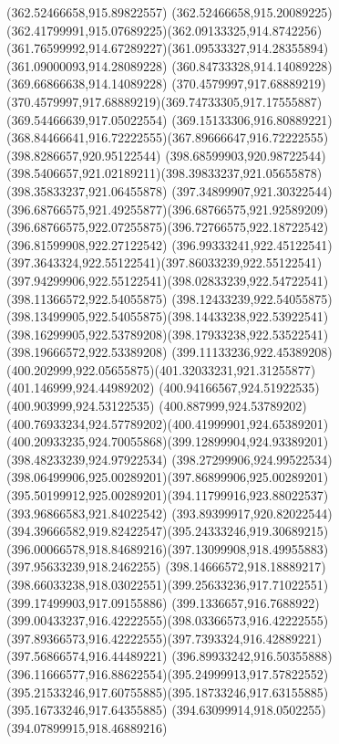 {{{{				\lineto(362.52466658,915.89822557)
				\curveto(362.52466658,915.20089225)(362.41799991,915.07689225)(362.09133325,914.8742256)
				\curveto(361.76599992,914.67289227)(361.09533327,914.28355894)(361.09000093,914.28089228)
				\lineto(360.84733328,914.14089228)
				\lineto(369.66866638,914.14089228)
				\lineto(370.4579997,917.68889219)
				\curveto(370.4579997,917.68889219)(369.74733305,917.17555887)(369.54466639,917.05022554)
				\curveto(369.15133306,916.80889221)(368.84466641,916.72222555)(367.89666647,916.72222555)
				\moveto(398.8286657,920.95122544)
				\curveto(398.68599903,920.98722544)(398.5406657,921.02189211)(398.39833237,921.05655878)
				\lineto(398.35833237,921.06455878)
				\curveto(397.34899907,921.30322544)(396.68766575,921.49255877)(396.68766575,921.92589209)
				\curveto(396.68766575,922.07255875)(396.72766575,922.18722542)(396.81599908,922.27122542)
				\curveto(396.99333241,922.45122541)(397.3643324,922.55122541)(397.86033239,922.55122541)
				\curveto(397.94299906,922.55122541)(398.02833239,922.54722541)(398.11366572,922.54055875)
				\curveto(398.12433239,922.54055875)(398.13499905,922.54055875)(398.14433238,922.53922541)
				\curveto(398.16299905,922.53789208)(398.17933238,922.53522541)(398.19666572,922.53389208)
				\curveto(399.11133236,922.45389208)(400.202999,922.05655875)(401.32033231,921.31255877)
				\lineto(401.146999,924.44989202)
				\lineto(400.94166567,924.51922535)
				\lineto(400.903999,924.53122535)
				\curveto(400.887999,924.53789202)(400.76933234,924.57789202)(400.41999901,924.65389201)
				\curveto(400.20933235,924.70055868)(399.12899904,924.93389201)(398.48233239,924.97922534)
				\curveto(398.27299906,924.99522534)(398.06499906,925.00289201)(397.86899906,925.00289201)
				\curveto(395.50199912,925.00289201)(394.11799916,923.88022537)(393.96866583,921.84022542)
				\curveto(393.89399917,920.82022544)(394.39666582,919.82422547)(395.24333246,919.30689215)
				\curveto(396.00066578,918.84689216)(397.13099908,918.49955883)(397.95633239,918.2462255)
				\lineto(398.14666572,918.18889217)
				\curveto(398.66033238,918.03022551)(399.25633236,917.71022551)(399.17499903,917.09155886)
				\curveto(399.1336657,916.7688922)(399.00433237,916.42222555)(398.03366573,916.42222555)
				\curveto(397.89366573,916.42222555)(397.7393324,916.42889221)(397.56866574,916.44489221)
				\curveto(396.89933242,916.50355888)(396.11666577,916.88622554)(395.24999913,917.57822552)
				\curveto(395.21533246,917.60755885)(395.18733246,917.63155885)(395.16733246,917.64355885)
				\lineto(394.63099914,918.0502255)
				\lineto(394.07899915,918.46889216)
}}}}
